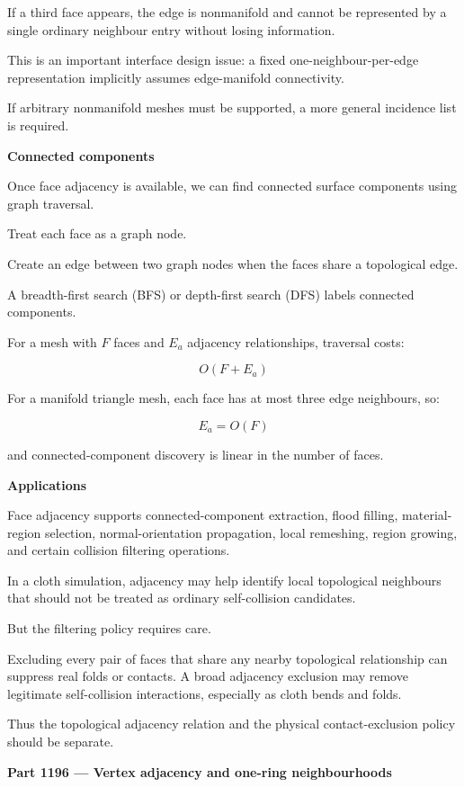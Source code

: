 If a third face appears, the edge is nonmanifold and cannot be represented by a single ordinary neighbour entry without losing information.

This is an important interface design issue: a fixed one-neighbour-per-edge representation implicitly assumes edge-manifold connectivity.

If arbitrary nonmanifold meshes must be supported, a more general incidence list is required.

\textbf{Connected components}

Once face adjacency is available, we can find connected surface components using graph traversal.

Treat each face as a graph node.

Create an edge between two graph nodes when the faces share a topological edge.

A breadth-first search (BFS) or depth-first search (DFS) labels connected components.

For a mesh with \(F\) faces and \(E_a\) adjacency relationships, traversal costs:

\[
\boxed{O(F+E_a)}
\]

For a manifold triangle mesh, each face has at most three edge neighbours, so:

\[
E_a=O(F)
\]

and connected-component discovery is linear in the number of faces.

\textbf{Applications}

Face adjacency supports connected-component extraction, flood filling, material-region selection, normal-orientation propagation, local remeshing, region growing, and certain collision filtering operations.

In a cloth simulation, adjacency may help identify local topological neighbours that should not be treated as ordinary self-collision candidates.

But the filtering policy requires care.

Excluding every pair of faces that share any nearby topological relationship can suppress real folds or contacts. A broad adjacency exclusion may remove legitimate self-collision interactions, especially as cloth bends and folds.

Thus the topological adjacency relation and the physical contact-exclusion policy should be separate.

\textbf{Part 1196 --- Vertex adjacency and one-ring neighbourhoods}

